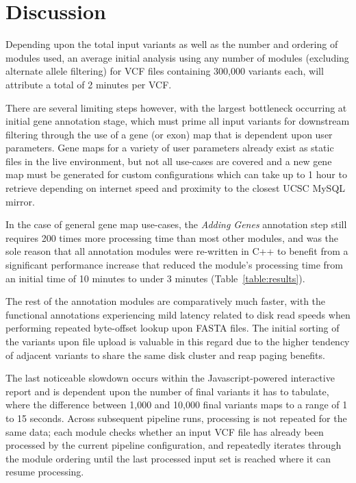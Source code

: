 \documentclass{bioinfo}
\begin{document}
\section{Discussion}

Depending upon the total input variants as well as the number and ordering of modules used, an average initial analysis using any number of modules (excluding alternate allele filtering) for VCF files containing 300,000 variants each, will attribute a total of 2 minutes per VCF.

There are several limiting steps however, with the largest bottleneck occurring at initial gene annotation stage, which must prime all input variants for downstream filtering through the use of a gene (or exon) map that is dependent upon user parameters. Gene maps for a variety of user parameters already exist as static files in the live environment, but not all use-cases are covered and a new gene map must be generated for custom configurations which can take up to 1 hour to retrieve depending on internet speed and proximity to the closest UCSC MySQL mirror.

In the case of general gene map use-cases, the \textit{Adding Genes} annotation step still requires 200 times more processing time than most other modules, and was the sole reason that all annotation modules were re-written in C++ to benefit from a significant performance increase that reduced the module's processing time from an initial time of 10 minutes to under 3 minutes (Table~\ref{table:results}). 

The rest of the annotation modules are comparatively much faster, with the functional annotations experiencing mild latency related to disk read speeds when performing repeated byte-offset lookup upon FASTA files. The initial sorting of the variants upon file upload is valuable in this regard due to the higher tendency of adjacent variants to share the same disk cluster and reap paging benefits.

The last noticeable slowdown occurs within the Javascript-powered interactive report and is dependent upon the number of final variants it has to tabulate, where the difference between 1,000 and 10,000 final variants maps to a range of 1 to 15 seconds. Across subsequent pipeline runs, processing is not repeated for the same data; each module checks whether an input VCF file has already been processed by the current pipeline configuration, and repeatedly iterates through the module ordering until the last processed input set is reached where it can resume processing.
\end{document}
